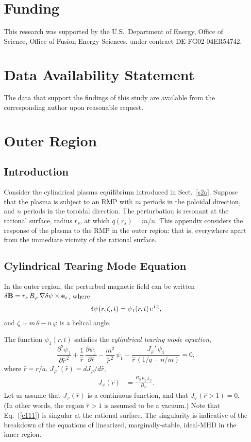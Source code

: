 \documentclass[12pt,prb,aps]{revtex4-1}
\begin{document}
\section*{Funding}
This research was supported by the U.S.\ Department of Energy, Office of Science, Office of Fusion Energy Sciences, under  contract DE-FG02-04ER54742. 

\section*{Data Availability Statement}
The data that support the findings of this study are available from the corresponding author upon reasonable request.

\appendix

\section{Outer Region}\label{outer}
\subsection{Introduction}
Consider the cylindrical plasma equilibrium introduced in Sect.~\ref{s2a}. Suppose that the plasma is subject to an RMP with $m$ periods in the
poloidal direction, and $n$ periods in the toroidal direction. The perturbation is resonant at the rational surface, radius $r_s$, at which $q(r_s)=m/n$. 
This appendix considers the response of the plasma to the RMP in the outer region: that is, everywhere apart from the immediate vicinity of the rational surface. 

\subsection{Cylindrical Tearing Mode Equation}
In the outer region, the perturbed magnetic field can be written $\delta {\bf B} = r_s\,B_\varphi\,\nabla\delta \psi\times{\bf e}_z$, where
\begin{equation}\label{e2}
\delta\psi(r,\zeta,t) = \psi_1(r,t)\,{\rm e}^{\,{\rm i}\,\zeta},
\end{equation}
and $\zeta=m\,\theta-n\,\varphi$ is a helical angle.\cite{err1}

The function $\psi_1(r,t)$ satisfies the {\em cylindrical tearing mode equation},\cite{err1,ric3,cyl,wes}
\begin{equation}\label{e111}
\frac{\partial^2\psi_1}{\partial\hat{r}^{\,2}} + \frac{1}{\hat{r}}\,\frac{\partial\psi_1}{\partial\hat{r}}-\frac{m^2}{\hat{r}^{\,2}}\,\psi_1
- \frac{J_\varphi'\,\psi_1}{\hat{r}\,(1/q-n/m)} = 0,
\end{equation}
where $\hat{r}=r/a$, $J_\varphi'(\hat{r})= dJ_\varphi/d\hat{r}$,
\begin{align}
J_\varphi(\hat{r}) &= \frac{R_0\,\mu_0\,j_\varphi}{B_\varphi}.
\end{align}
Let us assume that $J_\varphi(\hat{r})$ is a continuous function, and that $J_\varphi(\hat{r}>1)=0$.  (In other words, the region $\hat{r}>1$ is assumed to be a vacuum.)
Note that Eq.~(\ref{e111}) is singular at the  rational surface. The singularity is indicative of the breakdown of the equations of linearized, 
marginally-stable, ideal-MHD in the  inner region.
 
\end{document}

